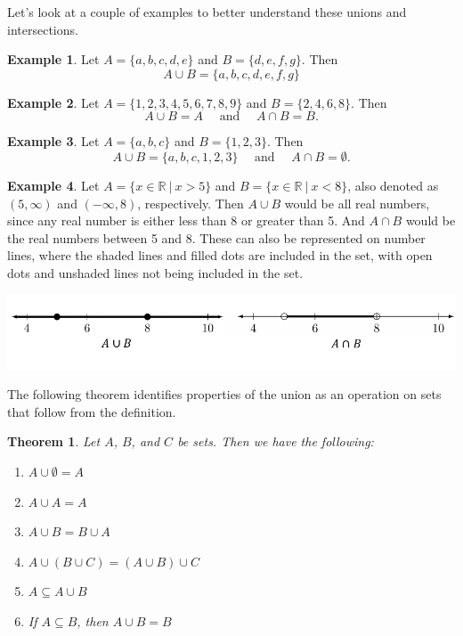 \documentclass[
]{book}
\newtheorem{theorem}{Theorem}[chapter]
\theoremstyle{definition}
\theoremstyle{definition}
\newtheorem{example}{Example}[chapter]
\theoremstyle{definition}
\theoremstyle{definition}
\theoremstyle{remark}
\begin{document}
Let's look at a couple of examples to better understand these unions and intersections.

\begin{example}
Let \(A = \{a, b, c, d, e\}\) and \(B = \{ d, e, f, g\}\). Then \[A\cup B=\{a, b, c, d, e, f, g\} \]
\end{example}

\begin{example}
Let \(A=\{1,2,3,4,5,6,7,8,9\}\) and \(B=\{2,4,6,8\}\). Then
\[A \cup B = A \quad \mbox{ and } \quad A\cap B = B.\]
\end{example}

\begin{example}
Let \(A=\{a,b,c\}\) and \(B=\{1,2,3\}\). Then
\[A\cup B = \{a,b,c,1,2,3\} \quad \mbox{ and } \quad A\cap B =\emptyset.\]
\end{example}

\begin{example}

Let \(A = \{ x\in \mathbb{R} \: \vert \: x > 5\}\) and \(B=\{x \in \mathbb{R} \: \vert \: x < 8\}\), also denoted as \((5,\infty)\) and \((-\infty, 8)\), respectively. Then \(A\cup B\) would be all real numbers, since any real number is either less than 8 or greater than 5. And \(A\cap B\) would be the real numbers between 5 and 8. These can also be represented on number lines, where the shaded lines and filled dots are included in the set, with open dots and unshaded lines not being included in the set.

\begin{center}\includegraphics[width=0.95\linewidth]{tikz/number-line-unions} \end{center}

\end{example}

The following theorem identifies properties of the union as an operation on sets that follow from the definition.

\begin{theorem}

Let \(A\), \(B\), and \(C\) be sets. Then we have the following:

\begin{enumerate}
\def\labelenumi{\arabic{enumi}.}
\item
  \(A\cup \emptyset = A\)
\item
  \(A \cup A = A\)
\item
  \(A \cup B = B \cup A\)
\item
  \(A \cup (B\cup C ) = (A\cup B) \cup C\)
\item
  \(A \subseteq A \cup B\)
\item
  If \(A \subseteq B\), then \(A\cup B=B\)
\end{enumerate}

\end{theorem}
\end{document}
